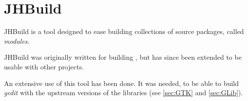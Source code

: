 
\section[JHBuild]{JHBuild\cite{website:jhbuild}}\label{sec:jhbuild}

JHBuild is a tool designed to ease building collections of source packages, called \emph{modules}.

JHBuild was originally written for building \GNOME, but has since been extended to be usable with other projects.

An extensive use of this tool has been done. It was needed, to be able to build \emph{gedit} with the upstream versions of the libraries (see \ref{sec:GTK} and \ref{sec:GLib}).
